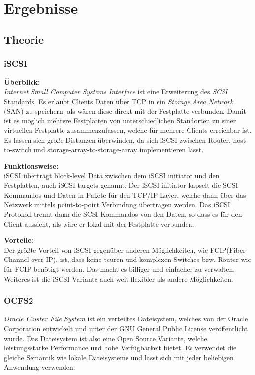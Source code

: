 
\section{Ergebnisse}
\subsection{Theorie}
\subsubsection{iSCSI}
\textbf{Überblick:}\\
\textit{Internet Small Computer Systems Interface} ist eine Erweiterung des \textit{SCSI} Standards. Es erlaubt Clients Daten über TCP in ein \textit{Storage Area Network} (SAN) zu speichern, als wären diese direkt mit der Festplatte verbunden. Damit ist es möglich mehrere Festplatten von unterschiedlichen Standorten zu einer virtuellen Festplatte zusammenzufassen, welche für mehrere Clients erreichbar ist. Es lassen sich große Distanzen überwinden, da sich iSCSI zwischen Router, host-to-switch und storage-array-to-storage-array implementieren lässt. 

\textbf{Funktionsweise:}\\
iSCSI überträgt block-level Data zwischen dem iSCSI initiator und den Festplatten, auch iSCSI targets genannt. Der iSCSI initiator kapselt die SCSI Kommandos und Daten in Pakete für den TCP/IP Layer, welche dann über das Netzwerk mittels point-to-point Verbindung übertragen werden. Das iSCSI Protokoll trennt dann die SCSI Kommandos von den Daten, so dass es für den Client aussieht, als wäre er lokal mit der Festplatte verbunden.

\textbf{Vorteile:}\\
Der größte Vorteil von iSCSI gegenüber anderen Möglichkeiten, wie FCIP(Fiber Channel over IP), ist, dass keine teuren und komplexen Switches bzw. Router wie für FCIP benötigt werden. Das macht es billiger und einfacher zu verwalten. Weiteres ist die iSCSI Variante auch weit flexibler als andere Möglichkeiten. 
\cite{iscsi}

\subsubsection{OCFS2}
\textit{Oracle Cluster File System} ist ein verteiltes Dateisystem, welches von der Oracle Corporation entwickelt und unter der GNU General Public License veröffentlicht wurde. Das Dateisystem ist also eine Open Source Variante, welche leistungsstarke Performance und hohe Verfügbarkeit bietet. Es verwendet die gleiche Semantik wie lokale Dateisysteme und lässt sich mit jeder beliebigen Anwendung verwenden. \cite{ocfs2}

